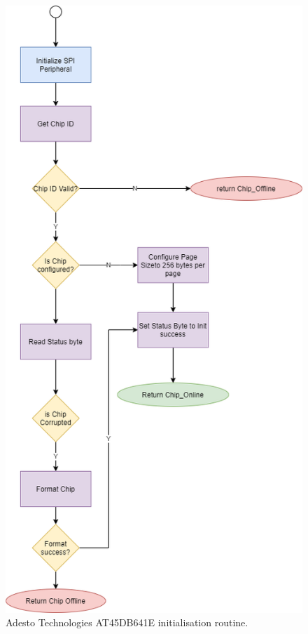 \begin{figure}[H]
	\centering
	\includegraphics[scale=0.3]{Flash Chip Init Routine.png}
	\caption{Adesto Technologies AT45DB641E initialisation routine.}
	\label{fig:Init_diagram_flash}
\end{figure}

